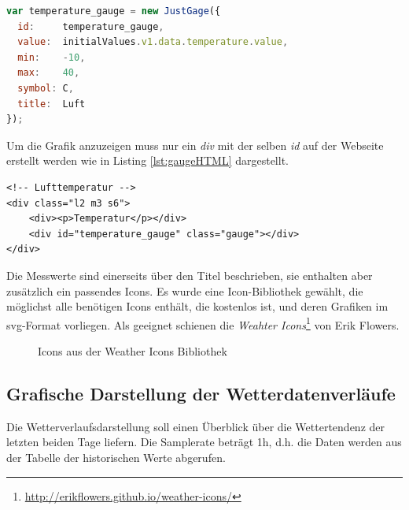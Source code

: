 \begin{lstlisting}[label=lst:gaugeJS,caption=Konfiguration der Gauge, language=JavaScript,mathescape, style=htmlcssjs]
var temperature_gauge = new JustGage({
  id:     temperature_gauge,
  value:  initialValues.v1.data.temperature.value,
  min:    -10,
  max:    40,
  symbol: C,
  title:  Luft
});
\end{lstlisting}

Um die Grafik anzuzeigen muss nur ein \emph{div} mit der selben \emph{id} auf der Webseite erstellt werden wie in Listing \ref{lst:gaugeHTML} dargestellt.

\vspace{3mm}
\begin{lstlisting}[label=lst:gaugeHTML,caption=Container für die SVG-Grafik (Gauge), language=HTML5, style=htmlcssjs]
<!-- Lufttemperatur -->
<div class="l2 m3 s6">
    <div><p>Temperatur</p></div>
    <div id="temperature_gauge" class="gauge"></div>
</div>
\end{lstlisting}
\vspace{3mm}


\noindent
Die Messwerte sind einerseits über den Titel beschrieben, sie enthalten aber zusätzlich ein passendes Icons. Es wurde eine Icon-Bibliothek gewählt, die möglichst alle benötigen Icons enthält, die kostenlos ist, und deren Grafiken im svg-Format vorliegen. Als geeignet schienen die \textit{Weahter Icons}\footnote{\url{http://erikflowers.github.io/weather-icons/}} von Erik Flowers.


\begin{figure}[h!]
	\centering
	\caption{Icons aus der Weather Icons Bibliothek}
	\label{img:icons}
\end{figure}





\subsection{Grafische Darstellung der Wetterdatenverläufe}
Die Wetterverlaufsdarstellung soll einen Überblick über die Wettertendenz der letzten beiden Tage liefern. Die Samplerate beträgt 1h, d.h. die Daten werden aus der Tabelle der historischen Werte abgerufen.

